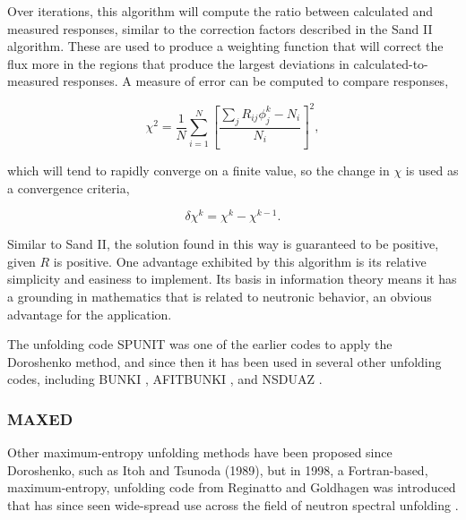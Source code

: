 Over iterations, this algorithm will compute the ratio between calculated and measured responses, similar to the correction factors described in the Sand II algorithm.
These are used to produce a weighting function that will correct the flux more in the regions that produce the largest deviations in calculated-to-measured responses.
A measure of error can be computed to compare responses,

\begin{equation}
\label{eqn:doroshenko-error}
\chi^2 = \frac{1}{N} \sum_{i=1}^N [\frac{\sum_j R_{ij} \phi_j^k - N_i}{N_i}]^2 ,
\end{equation}

\noindent
which will tend to rapidly converge on a finite value, so the change in $\chi$ is used as a convergence criteria,

\begin{equation}
\label{eqn:doroshenko-error-delta}
\delta \chi^k = \chi^k - \chi^{k-1} .
\end{equation}

\noindent
Similar to Sand II, the solution found in this way is guaranteed to be positive, given $R$ is positive.
One advantage exhibited by this algorithm is its relative simplicity and easiness to implement.
Its basis in information theory means it has a grounding in mathematics that is related to neutronic behavior, an obvious advantage for the application.

The unfolding code SPUNIT \cite{brackenbush1983spunit} was one of the earlier codes to apply the Doroshenko method, and since then it has been used in several other unfolding codes, including BUNKI \cite{lowry1984modifications}, AFITBUNKI \cite{miller1993afitbunki}, and NSDUAZ \cite{vega2012nsduaz}.




\subsubsection{MAXED}

Other maximum-entropy unfolding methods have been proposed since Doroshenko, such as Itoh and Tsunoda (1989), but in 1998, a Fortran-based, maximum-entropy, unfolding code from Reginatto and Goldhagen was introduced that has since seen wide-spread use across the field of neutron spectral unfolding \cite{reginatto1999maxed}.

